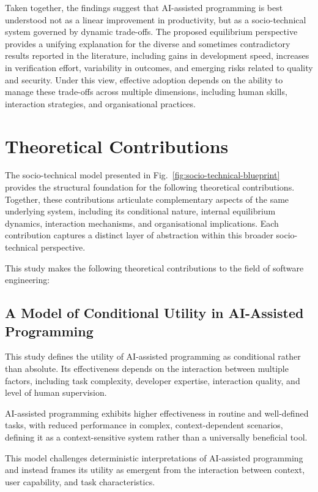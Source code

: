\documentclass[conference]{IEEEtran}
\begin{document}
Taken together, the findings suggest that AI-assisted programming is best understood not as a linear improvement in productivity, but as a socio-technical system governed by dynamic trade-offs. The proposed equilibrium perspective provides a unifying explanation for the diverse and sometimes contradictory results reported in the literature, including gains in development speed, increases in verification effort, variability in outcomes, and emerging risks related to quality and security. Under this view, effective adoption depends on the ability to manage these trade-offs across multiple dimensions, including human skills, interaction strategies, and organisational practices.

\section{Theoretical Contributions}

The socio-technical model presented in Fig.~\ref{fig:socio-technical-blueprint} provides the structural foundation for the following theoretical contributions. Together, these contributions articulate complementary aspects of the same underlying system, including its conditional nature, internal equilibrium dynamics, interaction mechanisms, and organisational implications. Each contribution captures a distinct layer of abstraction within this broader socio-technical perspective.

This study makes the following theoretical contributions to the field of software engineering:

\subsection{A Model of Conditional Utility in AI-Assisted Programming}

This study defines the utility of AI-assisted programming as conditional rather than absolute. Its effectiveness depends on the interaction between multiple factors, including task complexity, developer expertise, interaction quality, and level of human supervision.

AI-assisted programming exhibits higher effectiveness in routine and well-defined tasks, with reduced performance in complex, context-dependent scenarios, defining it as a context-sensitive system rather than a universally beneficial tool.

This model challenges deterministic interpretations of AI-assisted programming and instead frames its utility as emergent from the interaction between context, user capability, and task characteristics.
\end{document}

